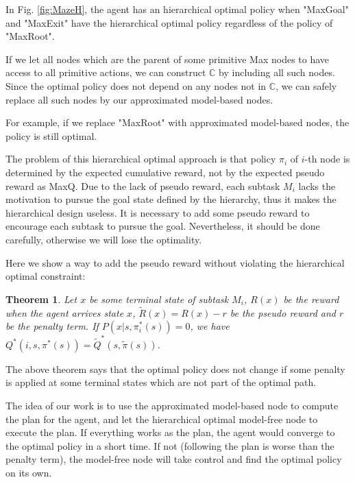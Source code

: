 \documentclass{article} %
\newtheorem{theorem}{Theorem}
\begin{document}
In Fig. \ref{fig:MazeH}, the agent has an hierarchical optimal policy when "MaxGoal" and "MaxExit"
have the hierarchical optimal policy regardless of the policy of "MaxRoot".

If we let all nodes which are the parent of some primitive Max nodes to have access
to all primitive actions, we can construct $\mathbb{C}$ by including all 
such nodes. Since the optimal policy does not depend on any nodes not in $\mathbb{C}$, 
we can safely replace all such nodes by our approximated model-based nodes.

For example, if we replace "MaxRoot" with approximated model-based nodes,
the policy is still optimal. 

The problem of this hierarchical optimal approach is that policy $\pi_i$ of $i$-th
node is determined by the expected cumulative reward, not by the expected pseudo reward as
MaxQ. Due to the lack of pseudo reward, each subtask $M_i$ lacks the motivation to 
pursue the goal state defined by the hierarchy, thus it makes the hierarchical 
design useless. 
It is necessary to add some pseudo reward to encourage each subtask to pursue 
the goal. Nevertheless, it should be done carefully, otherwise we will lose
the optimality.

Here we show a way to add the pseudo reward without violating the hierarchical 
optimal constraint:
\begin{theorem}
    Let $x$ be some terminal state of subtask $M_i$, $R(x)$ be the reward
    when the agent arrives state $x$, $\tilde{R}(x) = R(x) - r$ be the pseudo reward
    and $r$ be the penalty term.
    If $P(x| s, \pi_i^*(s)) = 0$, we have $Q^*(i, s, \pi^*(s)) = \tilde{Q}^*(s, \tilde{\pi}(s))$.
\end{theorem}

The above theorem says that the optimal policy does not change 
if some penalty is applied at some terminal states which are not part of the optimal path.




The idea of our work is to use the approximated model-based node to 
compute the plan for the agent, and let the hierarchical optimal model-free node
to execute the plan. If everything works as the plan, the agent would converge to the optimal
policy in a short time. If not (following the plan is worse than the penalty term),
the model-free node will take control and find the optimal policy on its own.
\end{document}
